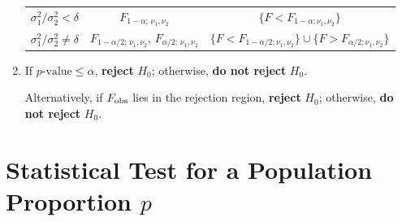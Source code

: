 \documentclass[twoside]{book}
\begin{document}
\begin{enumerate}
\begin{table}[H]
\begin{tabular}{@{}c|c|c@{}}
			\({\sigma_1^2}/{\sigma_2^2} < \delta\) &
			\(F_{1-\alpha;\,\nu_1,\nu_2}\) &
			\(\{F < F_{1-\alpha;\nu_1,\nu_2}\}\) \\[6pt]

			\({\sigma_1^2}/{\sigma_2^2} \neq \delta\) &
			\(F_{1-\alpha/2;\,\nu_1,\nu_2},\, F_{\alpha/2;\,\nu_1,\nu_2}\) &
			\(\{F < F_{1-\alpha/2;\nu_1,\nu_2}\} \cup \{F > F_{\alpha/2;\nu_1,\nu_2}\}\)
			\\
			\bottomrule
		\end{tabular}
	\end{table}

	\item If \(p\text{-value} \le \alpha\), \textbf{reject} \(H_0\); otherwise, \textbf{do not reject} \(H_0\).

	Alternatively, if \(F_{\rm obs}\) lies in the rejection region, \textbf{reject} \(H_0\); otherwise, \textbf{do not reject} \(H_0\).
\end{enumerate}



\section{Statistical Test for a Population Proportion \(p\)}
\end{document}
